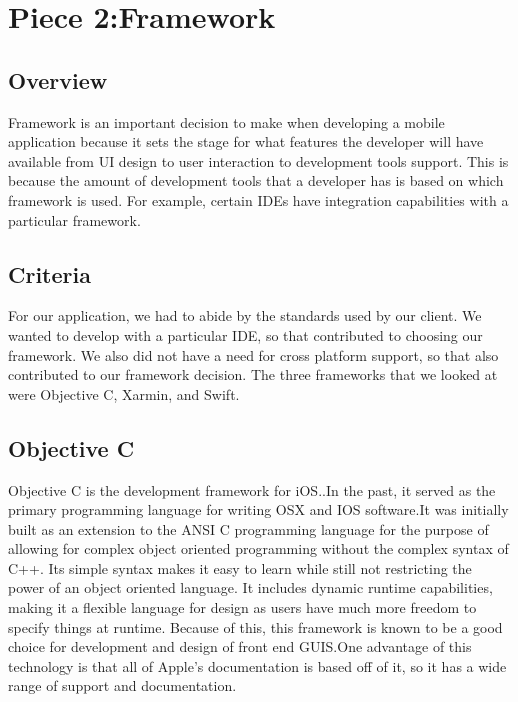 \documentclass[onecolumn, draftclsnofoot,10pt, compsoc]{IEEEtran}
\begin{document}
\section{Piece 2:Framework}    
   \subsection{Overview}
    Framework is an important decision to make when developing a mobile application because it sets the stage for what features the developer will have available from UI design to user interaction to development tools support. This is because the amount of development tools that a developer has is based on which framework is used. For example, certain IDEs have integration capabilities with a particular framework.
    \subsection{Criteria}
   For our application, we had to abide by the standards used by our client. We wanted to develop with a particular IDE, so that contributed to choosing our framework. We also did not have a need for cross platform support, so that also contributed to our framework decision. The three frameworks that we looked at were Objective C, Xarmin, and Swift.
    \subsection{Objective C}
    Objective C is the development framework for iOS.\cite{ObjectiveC}.In the past, it served as the primary programming language for writing OSX and IOS software.\cite{ObjectiveCInterface}It was initially built as an extension to the ANSI C programming language for the purpose of allowing for complex object oriented programming without the complex syntax of C++. Its simple syntax makes it easy to learn while still not restricting the power of an object oriented language. It includes dynamic runtime capabilities, making it a flexible language for design as users have much more freedom to specify things at runtime. Because of this, this framework is known to be a good choice for development and design of front end GUIS.One advantage of this technology is that all of Apple's documentation is based off of it, so it has a wide range of support and documentation. 
\end{document}
